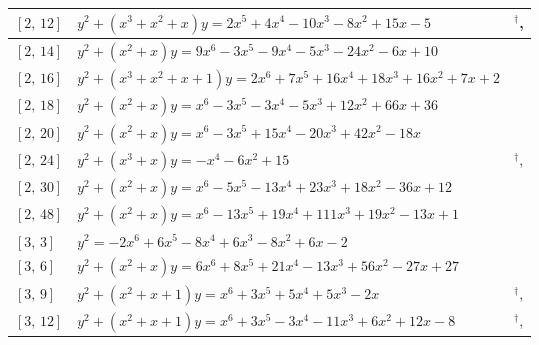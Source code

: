 \documentclass[11pt]{amsart}
\begin{document}
\begin{longtable}{|>{\raggedright\arraybackslash}p{1.7cm}|>{\raggedright\arraybackslash}p{}|>{\raggedright\arraybackslash}p{2.6cm}|}
$[2,\,12]$ & \href{https://www.lmfdb.org/Genus2Curve/Q/450/a/36450/1}{$y^2 + (x^{3}+x^{2}+x)y = 2x^{5}+4x^{4}-10x^{3}-8x^{2}+15x-5$} & \cite{HLP2000}$^\dagger$, \cite{BSSVY}\\ \hline
$[2,\,14]$ & \href{https://alpha.lmfdb.org/Genus2Curve/Q/?jump=[[10,-6,-24,-5,-9,-3,9],[0,1,1]]}{$y^2 + (x^{2}+x)y = 9x^{6}-3x^{5}-9x^{4}-5x^{3}-24x^{2}-6x+10$} & \cite{BookerSutherland}\\ \hline
$[2,\,16]$ & \href{https://alpha.lmfdb.org/Genus2Curve/Q/?jump=[[2,7,16,18,16,7,2],[1,1,1,1]]}{$y^2 + (x^{3}+x^{2}+x+1)y = 2x^{6}+7x^{5}+16x^{4}+18x^{3}+16x^{2}+7x+2$} & \cite{BookerSutherland}\\ \hline
$[2,\,18]$ & \href{https://alpha.lmfdb.org/Genus2Curve/Q/?jump=[[36,66,12,-5,-3,-3,1],[0,1,1]]}{$y^2 + (x^{2}+x)y = x^{6}-3x^{5}-3x^{4}-5x^{3}+12x^{2}+66x+36$} & \cite{BookerSutherland}\\ \hline
$[2,\,20]$ & \href{https://alpha.lmfdb.org/Genus2Curve/Q/?jump=[[0,-18,42,-20,15,-3,1],[0,1,1]]}{$y^2 + (x^{2}+x)y = x^{6}-3x^{5}+15x^{4}-20x^{3}+42x^{2}-18x$} & \cite{BookerSutherland}\\ \hline
$[2,\,24]$ & \href{https://alpha.lmfdb.org/Genus2Curve/Q/?jump=[[15,0,-6,0,-1],[0,1,0,1]]}{$y^2 + (x^{3}+x)y = -x^{4}-6x^{2}+15$} & \cite{HLP2000}$^\dagger$, \cite{BookerSutherland}\\ \hline
$[2,\,30]$ & \href{https://alpha.lmfdb.org/Genus2Curve/Q/?jump=[[12,-36,18,23,-13,-5,1],[0,1,1]]}{$y^2 + (x^{2}+x)y = x^{6}-5x^{5}-13x^{4}+23x^{3}+18x^{2}-36x+12$} & \cite{BookerSutherland}\\ \hline
$[2,\,48]$ & \href{https://alpha.lmfdb.org/Genus2Curve/Q/?jump=[[1,-13,19,111,19,-13,1],[0,1,1]]}{$y^2 + (x^{2}+x)y = x^{6}-13x^{5}+19x^{4}+111x^{3}+19x^{2}-13x+1$} & \cite{BookerSutherland}\\ \hline
$[3,\,3]$ & \href{https://alpha.lmfdb.org/Genus2Curve/Q/?jump=[[-2,6,-8,6,-8,6,-2],[0]]}{$y^2 = -2x^{6}+6x^{5}-8x^{4}+6x^{3}-8x^{2}+6x-2$} & \cite{BSSVY}\\ \hline
$[3,\,6]$ & \href{https://alpha.lmfdb.org/Genus2Curve/Q/?jump=[[27,-27,56,-13,21,8,6],[0,1,1]]}{$y^2 + (x^{2}+x)y = 6x^{6}+8x^{5}+21x^{4}-13x^{3}+56x^{2}-27x+27$} & \cite{BSSVY}\\ \hline
$[3,\,9]$ & \href{https://alpha.lmfdb.org/Genus2Curve/Q/?jump=[[0,-2,0,5,5,3,1],[1,1,1]]}{$y^2 + (x^{2}+x+1)y = x^{6}+3x^{5}+5x^{4}+5x^{3}-2x$} & \cite{Leprevost1995}$^\dagger$, \cite{BSSVY}\\ \hline
$[3,\,12]$ & \href{https://alpha.lmfdb.org/Genus2Curve/Q/?jump=[[-8,12,6,-11,-3,3,1],[1,1,1]]}{$y^2 + (x^{2}+x+1)y = x^{6}+3x^{5}-3x^{4}-11x^{3}+6x^{2}+12x-8$} & \cite{HLP2000}$^\dagger$, \cite{BookerSutherland}\\ \hline

\end{longtable}
\end{document}
